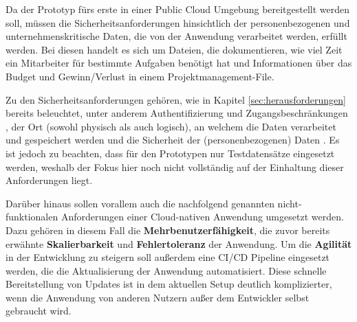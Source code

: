 Da der Prototyp fürs erste in einer Public Cloud Umgebung bereitgestellt werden soll, müssen die Sicherheitsanforderungen hinsichtlich der personenbezogenen und unternehmenskritische Daten, die von der Anwendung verarbeitet werden, erfüllt werden. Bei diesen handelt es sich um Dateien, die dokumentieren, wie viel Zeit ein Mitarbeiter für bestimmte Aufgaben benötigt hat und Informationen über das Budget und Gewinn/Verlust in einem Projektmanagement-File.

Zu den Sicherheitsanforderungen gehören, wie in Kapitel \ref{sec:herausforderungen} bereits beleuchtet, unter anderem Authentifizierung und Zugangsbeschränkungen \cite[Vgl.][S. 695]{Kumar2018}, der Ort (sowohl physisch als auch logisch), an welchem die Daten verarbeitet und gespeichert werden \cite[Vgl.][S. 696]{Kumar2018} und die Sicherheit der (personenbezogenen) Daten \cite[Vgl.][S. 696]{Kumar2018}. Es ist jedoch zu beachten, dass für den Prototypen nur Testdatensätze eingesetzt werden, weshalb der Fokus hier noch nicht vollständig auf der Einhaltung dieser Anforderungen liegt.


Darüber hinaus sollen vorallem auch die nachfolgend genannten nicht-funktionalen Anforderungen einer Cloud-nativen Anwendung umgesetzt werden. Dazu gehören in diesem Fall die \textbf{Mehrbenutzerfähigkeit}, die zuvor bereits erwähnte \textbf{Skalierbarkeit} und \textbf{Fehlertoleranz} der Anwendung. Um die \textbf{Agilität} in der Entwicklung zu steigern soll außerdem eine CI/CD Pipeline eingesetzt werden, die die Aktualisierung der Anwendung automatisiert. Diese schnelle Bereitstellung von Updates ist in dem aktuellen Setup deutlich komplizierter, wenn die Anwendung von anderen Nutzern außer dem Entwickler selbst gebraucht wird.

\pagebreak